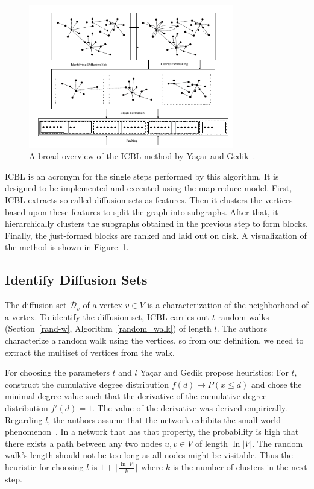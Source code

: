     \begin{figure}[htp]
        \begin{center}
            \includegraphics[keepaspectratio,width=0.8\textwidth]{img/06-rel_w/icbl.png}
        \end{center}
        \caption{A broad overview of the ICBL method by Ya\c{c}ar and Gedik~\autocite{yacsar2015scalable}.} 
        \label{icbl}
    \end{figure}

    ICBL is an acronym for the single steps performed by this algorithm. 
    It is designed to be implemented and executed using the map-reduce model.
    First, ICBL extracts so-called diffusion sets as features.
    Then it clusters the vertices based upon these features to split the graph into subgraphs.
    After that, it hierarchically clusters the subgraphs obtained in the previous step to form blocks.
    Finally, the just-formed blocks are ranked and laid out on disk.
    A visualization of the method is shown in Figure~\ref{icbl}.
    
    \subsection*{Identify Diffusion Sets}
    The diffusion set $\mathcal{D}_v$ of a vertex $v \in V$ is a characterization of the neighborhood of a vertex. 
    To identify the diffusion set, ICBL carries out $t$ random walks (Section~\ref{rand-w}, Algorithm~\ref{random_walk}) of length $l$.
    The authors characterize a random walk using the vertices, so from our definition, we need to extract the multiset of vertices from the walk.
    
    For choosing the parameters $t$ and $l$ Ya\c{c}ar and Gedik propose heuristics: 
    For $t$, construct the cumulative degree distribution $f(d) \mapsto P(x \leq d)$ and chose the minimal degree value such that the derivative of the cumulative degree distribution $f'(d) = 1$. The value of the derivative was derived empirically.
    Regarding $l$, the authors assume that the network exhibits the small world phenomenon~\autocite{kleinberg2000small}.
    In a network that has that property, the probability is high that there exists a path between any two nodes $u,v \in V$ of length $\ln{|V|}$.
    The random walk's length should not be too long as all nodes might be visitable. Thus the heuristic for choosing $l$ is $1 + \lceil \frac{\ln |V|}{k} \rceil$ where $k$ is the number of clusters in the next step.
    

